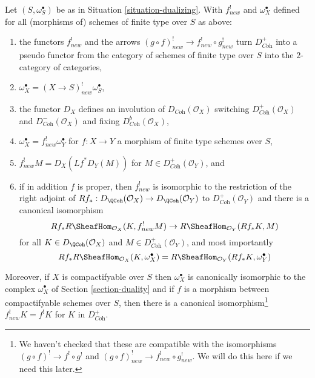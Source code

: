 \begin{lemma}
\label{lemma-duality-bootstrap}
Let $(S, \omega_S^\bullet)$ be as in Situation \ref{situation-dualizing}.
With $f^!_{new}$ and $\omega_X^\bullet$ defined for all (morphisms of)
schemes of finite type over $S$ as above:
\begin{enumerate}
\item the functors $f^!_{new}$ and the arrows
$(g \circ f)^!_{new} \to f^!_{new} \circ g^!_{new}$
turn $D_{\textit{Coh}}^+$ into a pseudo functor from the category of
schemes of finite type over $S$ into the $2$-category of categories,
\item $\omega_X^\bullet = (X \to S)^!_{new} \omega_S^\bullet$,
\item the functor $D_X$
defines an involution of $D_{\textit{Coh}}(\mathcal{O}_X)$
switching $D_{\textit{Coh}}^+(\mathcal{O}_X)$ and
$D_{\textit{Coh}}^-(\mathcal{O}_X)$ and fixing
$D_{\textit{Coh}}^b(\mathcal{O}_X)$,
\item $\omega_X^\bullet = f^!_{new}\omega_Y^\bullet$ for
$f : X \to Y$ a morphism of finite type schemes over $S$,
\item $f^!_{new}M = D_X(Lf^*D_Y(M))$ for
$M \in D_{\textit{Coh}}^+(\mathcal{O}_Y)$, and
\item if in addition $f$ is proper, then $f^!_{new}$ is isomorphic
to the restriction of the right adjoint of
$Rf_* : D_\QCoh(\mathcal{O}_X) \to D_\QCoh(\mathcal{O}_Y)$ to
$D_{\textit{Coh}}^+(\mathcal{O}_Y)$ and there is a canonical isomorphism
$$
Rf_*R\SheafHom_{\mathcal{O}_X}(K, f^!_{new}M)
\to
R\SheafHom_{\mathcal{O}_Y}(Rf_*K, M)
$$
for all $K \in D_\QCoh(\mathcal{O}_X)$ and
$M \in D_{\textit{Coh}}^+(\mathcal{O}_Y)$, and most importantly
$$
Rf_*R\SheafHom_{\mathcal{O}_X}(K, \omega_X^\bullet) =
R\SheafHom_{\mathcal{O}_Y}(Rf_*K, \omega_Y^\bullet)
$$
\end{enumerate}
Moreover, if $X$ is compactifyable over $S$ then
$\omega_X^\bullet$ is canonically isomorphic to the complex
$\omega_X^\bullet$ of Section \ref{section-duality} and
if $f$ is a morphism between compactifyable schemes
over $S$, then there is a canonical isomorphism\footnote{We haven't
checked that these are compatible with the isomorphisms
$(g \circ f)^! \to f^! \circ g^!$ and
$(g \circ f)^!_{new} \to f^!_{new} \circ g^!_{new}$. We will do this
here if we need this later.}
$f_{new}^!K = f^!K$ for $K$ in $D_{\textit{Coh}}^+$.
\end{lemma}

